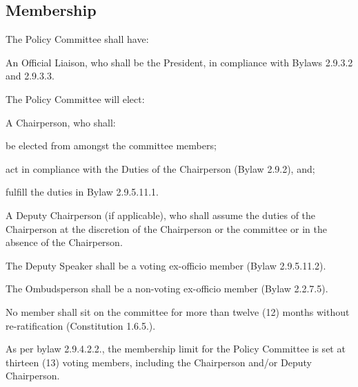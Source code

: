 \subsection{Membership}
\begin{longenum}[ label*=\thesubsection.\arabic*., align=left] 
\item The Policy Committee shall have:
	\begin{longenum}[label*=\arabic*., align=left]	
	\item An Official Liaison, who shall be the President, in compliance with Bylaws 2.9.3.2 and
2.9.3.3.
	\item The Policy Committee will elect:
		\begin{longenum}[label*=\arabic*., align=left]	
		\item A Chairperson, who shall:
			\begin{longenum}[label*=\arabic*., align=left]	
			\item be elected from amongst the committee members;
			\item act in compliance with the Duties of the Chairperson (Bylaw 2.9.2), and;
			\item fulfill the duties in Bylaw 2.9.5.11.1.
			\end{longenum}
		\item A Deputy Chairperson (if applicable), who shall assume the duties of the Chairperson at the discretion of the Chairperson or the committee or in the absence of the Chairperson.
		\end{longenum}
	\item The Deputy Speaker shall be a voting ex-officio member (Bylaw 2.9.5.11.2).
	\item The Ombudsperson shall be a non-voting ex-officio member (Bylaw 2.2.7.5).
	\end{longenum}
\item No member shall sit on the committee for more than twelve (12) months without re-ratification (Constitution 1.6.5.).
\item As per bylaw 2.9.4.2.2., the membership limit for the Policy Committee is set at thirteen (13) voting members, including the Chairperson and/or Deputy Chairperson.
\end{longenum}

